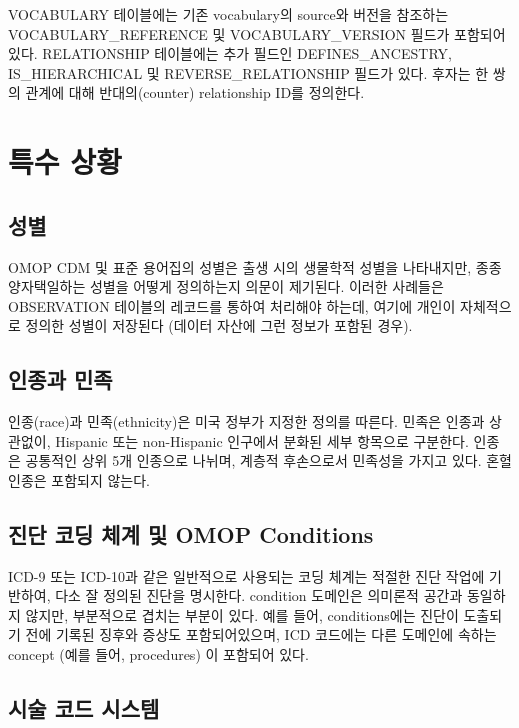\documentclass[11pt]{book}
\theoremstyle{definition}
\theoremstyle{definition}
\theoremstyle{definition}
\theoremstyle{remark}
\begin{document}
VOCABULARY 테이블에는 기존 vocabulary의 source와 버전을 참조하는
VOCABULARY\_REFERENCE 및 VOCABULARY\_VERSION 필드가 포함되어 있다.
RELATIONSHIP 테이블에는 추가 필드인 DEFINES\_ANCESTRY, IS\_HIERARCHICAL
및 REVERSE\_RELATIONSHIP 필드가 있다. 후자는 한 쌍의 관계에 대해
반대의(counter) relationship ID를 정의한다.

\section{특수 상황}\label{specialSituations}

\subsection{성별}

OMOP CDM 및 표준 용어집의 성별은 출생 시의 생물학적 성별을 나타내지만,
종종 양자택일하는 성별을 어떻게 정의하는지 의문이 제기된다. 이러한
사례들은 OBSERVATION 테이블의 레코드를 통하여 처리해야 하는데, 여기에
개인이 자체적으로 정의한 성별이 저장된다 (데이터 자산에 그런 정보가
포함된 경우).

\subsection{인종과 민족}\label{-}

인종(race)과 민족(ethnicity)은 미국 정부가 지정한 정의를 따른다. 민족은
인종과 상관없이, Hispanic 또는 non-Hispanic 인구에서 분화된 세부
항목으로 구분한다. 인종은 공통적인 상위 5개 인종으로 나뉘며, 계층적
후손으로서 민족성을 가지고 있다. 혼혈 인종은 포함되지 않는다.

\subsection{진단 코딩 체계 및 OMOP
Conditions}\label{----omop-conditions}

ICD-9 또는 ICD-10과 같은 일반적으로 사용되는 코딩 체계는 적절한 진단
작업에 기반하여, 다소 잘 정의된 진단을 명시한다. condition 도메인은
의미론적 공간과 동일하지 않지만, 부분적으로 겹치는 부분이 있다. 예를
들어, conditions에는 진단이 도출되기 전에 기록된 징후와 증상도
포함되어있으며, ICD 코드에는 다른 도메인에 속하는 concept (예를 들어,
procedures) 이 포함되어 있다.

\subsection{시술 코드 시스템}\label{--}
\end{document}
